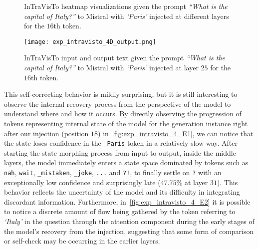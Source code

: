 \begin{figure}[tp!]
    \centering
    \quad
    \caption{InTraVisTo heatmap visualizations given the prompt \emph{``What is the capital of Italy?''} to Mistral with \emph{`Paris'} injected at different layers for the $16$th token.}
    \label{fig:exp_intravisto_4_D}
\end{figure}

\begin{figure}[tp!]
    \centering
    \texttt{[image: exp\_intravisto\_4D\_output.png]}
    \caption{InTraVisTo input and output text given the prompt \emph{``What is the capital of Italy?''} to Mistral with \emph{`Paris'} injected at layer $25$ for the $16$th token.}
    \label{fig:exp_intravisto_4_D3}
\end{figure}

This self-correcting behavior is mildly surprising, but it is still interesting to observe the internal recovery process from the perspective of the model to understand where and how it occurs.
By directly observing the progression of tokens representing internal state of the model for the generation instance right after our injection (position $18$) in~\cref{fig:exp_intravisto_4_E1}, we can notice that the state loses confidence in the \texttt{\_Paris} token in a relatively slow way.
After starting the state morphing process from input to output, inside the middle layers, the model immediately enters a state space dominated by tokens such as \texttt{nah}, \texttt{wait}, \texttt{\_mistaken}, \texttt{\_joke}, \texttt{...} and \texttt{?!}, to finally settle on \texttt{?} with an exceptionally low confidence and surprisingly late ($47.75\%$ at layer $31$). %
This behavior reflects the uncertainty of the model and its difficulty in integrating discordant information.
Furthermore, in~\cref{fig:exp_intravisto_4_E2} it is possible to notice a discrete amount of flow being gathered by the token referring to \emph{`Italy'} in the question through the attention component during the early stages of the model's recovery from the injection, suggesting that some form of comparison or self-check may be occurring in the earlier layers.

